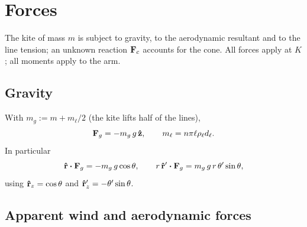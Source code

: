 \documentclass[10pt, a4paper]{article}
\begin{document}
\section{Forces}
\label{sec:forces}

The kite of mass $m$ is subject to gravity, to the aerodynamic resultant and
to the line tension; an unknown reaction $\vb F_c$ accounts for the cone.
All forces apply at $K$; all moments apply to the arm.

\subsection{Gravity}

With $m_g := m + m_\ell / 2$ (the kite lifts half of the lines),
\begin{equation} \label{eq:f-grav}
    \vb F_g = -m_g\, g\,\vu z,
    \qquad
    m_\ell = n \pi \ell \rho_\ell d_\ell.
\end{equation}
In particular
\begin{equation} \label{eq:f-grav-projections}
    \rhat \vdot \vb F_g = -m_g\, g \cos\theta,
    \qquad
    r\,\rhat' \vdot \vb F_g = m_g\, g\, r\,\theta'\sin\theta,
\end{equation}
using $\vu r_z = \cos\theta$ and $\vu r'_z = -\theta'\sin\theta$.

\subsection{Apparent wind and aerodynamic forces}
\end{document}
